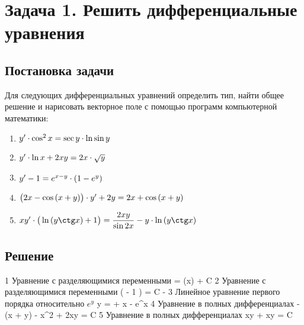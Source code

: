 

\section{Задача 1. Решить дифференциальные уравнения}
\subsection{Постановка задачи}
Для следующих дифференциальных уравнений определить тип, найти общее
решение и нарисовать векторное поле с помощью программ компьютерной математики:

\begin{enumerate}[label={}]
	\item $ {y}' \cdot \cos^{2}{x} = \sec{y} \cdot \ln{\sin{y}} $
	\item $ {y}' \cdot \ln{x} + 2xy = 2x \cdot \sqrt{y} $
	\item $ {y}' - 1 = e^{x-y} \cdot (1 - e^{y}) $    
	\item $ \big(2x - \cos{(x + y)} \big) \cdot {y}' + 2y = 2{x} + \cos{(x + y)} $
	\item $ \equationFifth $
\end{enumerate}

\newpage

\subsection{Решение}
\begin{enumerate}
	\taskOneSolutionItem
		{1}
		{\equationFirst}
		{Уравнение с разделяющимися переменными}
		{ = \tan(x) + {C}}
	\taskOneSolutionItem
		{2}
		{\equationSecond}
		{Уравнение с разделяющимися переменными}
		{\ln\big(  - 1 \big) = C - }
	\taskOneSolutionItem
		{3}
		{\equationThird}
		{Линейное уравнение первого порядка относительно $ e^y $}
		{y =  + {x} - e^{x}}
	\taskOneSolutionItem
		{4}
		{\equationFourth}
		{Уравнение в полных дифференциалах}
		{-\sin(x + y) - {x}^2 + 2xy = C}
	\taskOneSolutionItem
		{5}
		{\equationFifth}
		{Уравнение в полных дифференциалах}
		{xy + xy = C}
\end{enumerate}
